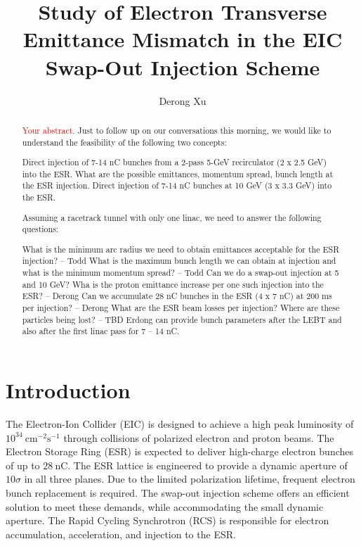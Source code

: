 \documentclass{article}
\title{Study of Electron Transverse Emittance Mismatch in the EIC Swap-Out Injection Scheme}
\author{Derong Xu}
\begin{document}
\maketitle

\begin{abstract}
\textcolor{red}{Your abstract.}
Just to follow up on our conversations this morning, we would like to understand the feasibility of the following two concepts:

    Direct injection of 7-14 nC bunches from a 2-pass 5-GeV recirculator (2 x 2.5 GeV) into the ESR.  What are the possible emittances, momentum spread, bunch length at the ESR injection.
    Direct injection of 7-14 nC bunches at 10 GeV (3 x 3.3 GeV) into the ESR.

Assuming a racetrack tunnel with only one linac, we need to answer the following questions:

    What is the minimum arc radius we need to obtain emittances acceptable for the ESR injection? -- Todd
    What is the maximum bunch length we can obtain at injection and what is the minimum momentum spread? -- Todd
    Can we do a swap-out injection at 5 and 10 GeV? Wha is the proton emittance increase per one such injection into the ESR? -- Derong
    Can we accumulate 28 nC bunches in the ESR (4 x 7 nC) at 200 ms per injection? -- Derong
    What are the ESR beam losses per injection? Where are these particles being lost? – TBD
Erdong can provide bunch parameters after the LEBT and also after the first linac pass for 7 – 14 nC.
\end{abstract}
\section{Introduction}
The Electron-Ion Collider (EIC) is designed to achieve a high peak luminosity of 
$10^{34}~\mathrm{cm}^{-2}\mathrm{s}^{-1}$ through collisions of polarized electron and 
proton beams. The Electron Storage Ring (ESR) is expected to 
deliver high-charge electron bunches of up to $28~\mathrm{nC}$.
The ESR lattice is engineered to provide a dynamic aperture of $10\sigma$ in all three 
planes. Due to the limited polarization lifetime, frequent electron bunch replacement 
is required. The swap-out injection scheme offers an efficient solution to meet these 
demands, while accommodating the small dynamic aperture. The Rapid Cycling Synchrotron 
(RCS) is responsible for electron accumulation, acceleration, and injection to the ESR.
\end{document}
